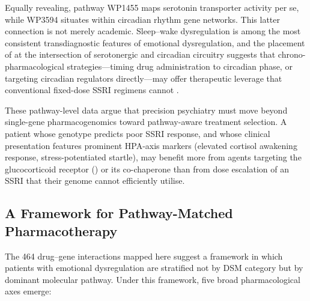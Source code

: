 Equally revealing, pathway WP1455 maps serotonin transporter activity per se,
while WP3594 situates  within circadian rhythm gene networks.
This latter connection is not merely academic. Sleep--wake dysregulation is among
the most consistent transdiagnostic features of emotional dysregulation, and
the placement of  at the intersection of serotonergic and
circadian circuitry suggests that chrono-pharmacological strategies---timing
drug administration to circadian phase, or targeting circadian regulators
directly---may offer therapeutic leverage that conventional fixed-dose SSRI
regimens cannot \cite{walker2020}.

These pathway-level data argue that precision psychiatry must move beyond
single-gene pharmacogenomics toward pathway-aware treatment selection. A
patient whose  genotype predicts poor SSRI response, and whose
clinical presentation features prominent HPA-axis markers (elevated cortisol
awakening response, stress-potentiated startle), may benefit more from agents
targeting the glucocorticoid receptor () or its co-chaperone
 than from dose escalation of an SSRI that their genome cannot
efficiently utilise.

\subsection*{A Framework for Pathway-Matched Pharmacotherapy}

The 464 drug--gene interactions mapped here suggest a framework in which
patients with emotional dysregulation are stratified not by DSM category but by
dominant molecular pathway. Under this framework,
five broad pharmacological axes emerge:

